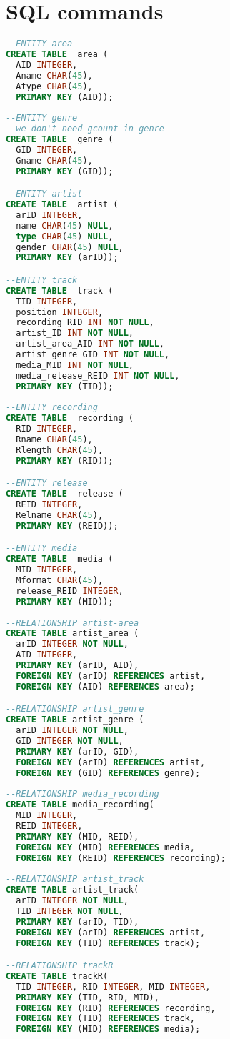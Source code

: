 \documentclass[11pt]{article} %
\begin{document}
\section{SQL commands}
\begin{lstlisting}[language=SQL, keywordstyle=\color{blue!70},
commentstyle=\color{red!50!green!50!blue!50},
rulesepcolor=\color{red!20!green!20!blue!20},
frame=shadowbox]
--ENTITY area
CREATE TABLE  area (
  AID INTEGER,
  Aname CHAR(45),
  Atype CHAR(45),
  PRIMARY KEY (AID));
  
--ENTITY genre
--we don't need gcount in genre
CREATE TABLE  genre (
  GID INTEGER,
  Gname CHAR(45),
  PRIMARY KEY (GID));

--ENTITY artist
CREATE TABLE  artist (
  arID INTEGER,
  name CHAR(45) NULL,
  type CHAR(45) NULL,
  gender CHAR(45) NULL,
  PRIMARY KEY (arID));

--ENTITY track
CREATE TABLE  track (
  TID INTEGER,
  position INTEGER,
  recording_RID INT NOT NULL,
  artist_ID INT NOT NULL,
  artist_area_AID INT NOT NULL,
  artist_genre_GID INT NOT NULL,
  media_MID INT NOT NULL,
  media_release_REID INT NOT NULL,
  PRIMARY KEY (TID));
  
--ENTITY recording
CREATE TABLE  recording (
  RID INTEGER,
  Rname CHAR(45),
  Rlength CHAR(45),
  PRIMARY KEY (RID));

--ENTITY release
CREATE TABLE  release (
  REID INTEGER,
  Relname CHAR(45),
  PRIMARY KEY (REID));

--ENTITY media
CREATE TABLE  media (
  MID INTEGER,
  Mformat CHAR(45),
  release_REID INTEGER,
  PRIMARY KEY (MID));
    
--RELATIONSHIP artist-area
CREATE TABLE artist_area (
  arID INTEGER NOT NULL,
  AID INTEGER,
  PRIMARY KEY (arID, AID),
  FOREIGN KEY (arID) REFERENCES artist,
  FOREIGN KEY (AID) REFERENCES area);

--RELATIONSHIP artist_genre
CREATE TABLE artist_genre (
  arID INTEGER NOT NULL,
  GID INTEGER NOT NULL,
  PRIMARY KEY (arID, GID),
  FOREIGN KEY (arID) REFERENCES artist,
  FOREIGN KEY (GID) REFERENCES genre);
    
--RELATIONSHIP media_recording
CREATE TABLE media_recording(
  MID INTEGER,
  REID INTEGER,
  PRIMARY KEY (MID, REID),
  FOREIGN KEY (MID) REFERENCES media,
  FOREIGN KEY (REID) REFERENCES recording);
  
--RELATIONSHIP artist_track
CREATE TABLE artist_track(
  arID INTEGER NOT NULL,
  TID INTEGER NOT NULL,
  PRIMARY KEY (arID, TID),
  FOREIGN KEY (arID) REFERENCES artist,
  FOREIGN KEY (TID) REFERENCES track);

--RELATIONSHIP trackR
CREATE TABLE trackR(
  TID INTEGER, RID INTEGER, MID INTEGER,
  PRIMARY KEY (TID, RID, MID),
  FOREIGN KEY (RID) REFERENCES recording,
  FOREIGN KEY (TID) REFERENCES track,
  FOREIGN KEY (MID) REFERENCES media);
\end{lstlisting}
\end{document}
